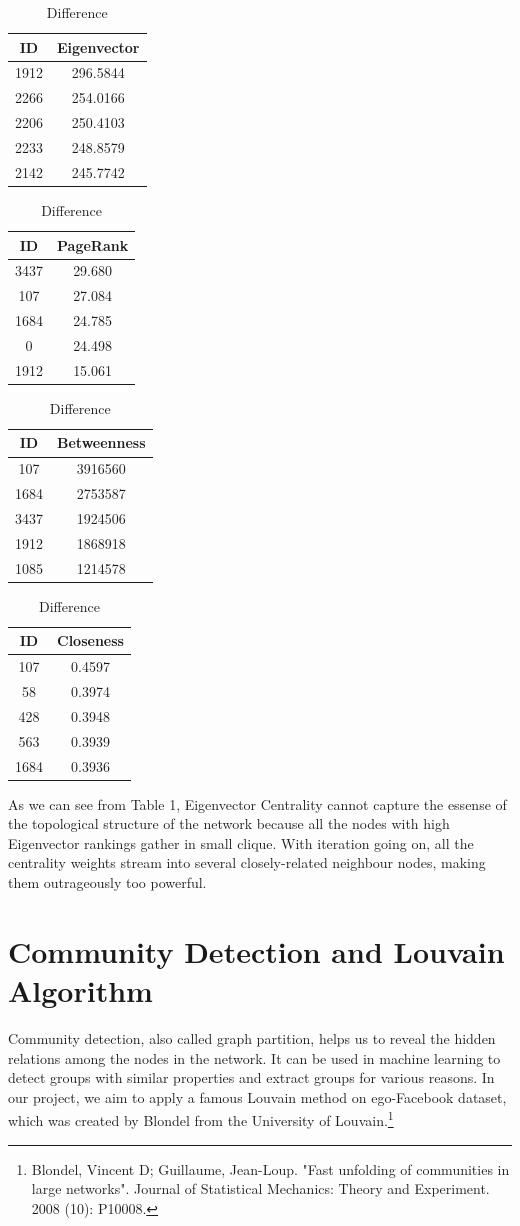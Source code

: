 \documentclass[11pt]{article}
\begin{document}
\begin{table}[H]
	\centering
	\parbox{.2\linewidth}{
		\centering
	\begin{tabular}{cc}
		\hline ID & Eigenvector\\\hline
		1912 & 296.5844\\
		2266 & 254.0166\\
		2206 & 250.4103\\
		2233 & 248.8579\\
		2142 & 245.7742
	\end{tabular}
}\quad
	\parbox{.2\linewidth}{
	\centering
	\begin{tabular}{cc}
		\hline ID & PageRank\\\hline
		3437 & 29.680\\
		107 & 27.084\\
		1684 & 24.785\\
		0 & 24.498\\
		1912 & 15.061
	\end{tabular}
}\quad
	\parbox{.2\linewidth}{
	\centering
	\begin{tabular}{cc}
		\hline ID & Betweenness\\\hline
		107 & 3916560\\
		1684 & 2753587\\
		3437 & 1924506\\
		1912 & 1868918\\
		1085 & 1214578
	\end{tabular}
}\quad
	\parbox{.2\linewidth}{
	\centering
	\begin{tabular}{cc}
		\hline ID & Closeness\\\hline
		107 & 0.4597\\
		58 & 0.3974\\
		428 & 0.3948\\
		563 & 0.3939\\
		1684 & 0.3936
	\end{tabular}
}
\caption{Difference}
\end{table}
As we can see from Table 1, Eigenvector Centrality cannot capture the essense of the topological structure of the network because all the nodes with high Eigenvector rankings gather in small clique. With iteration going on, all the centrality weights stream into several closely-related neighbour nodes, making them outrageously too powerful.
\section{Community Detection and Louvain Algorithm}
Community detection, also called graph partition, helps us to reveal the hidden relations among the nodes in the network. It can be used in machine learning to detect groups with similar properties and extract groups for various reasons. In our project, we aim to apply a famous Louvain method on ego-Facebook dataset, which was created by Blondel from the University of Louvain.\footnote{Blondel, Vincent D; Guillaume, Jean-Loup. "Fast unfolding of communities in large networks". Journal of Statistical Mechanics: Theory and Experiment. 2008 (10): P10008.}
\end{document}

